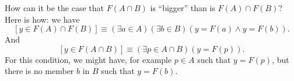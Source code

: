 \documentclass[12pt,fleqn,answers]{exam}
\begin{document}
\begin{questions}
\begin{parts}
\begin{solution}
      \quad How can it be the case that $F(A \cap B)$ is ``bigger'' 
      than is \mbox{$F(A) \cap F(B)$}? Here is how: we have
      \begin{equation*}
        \left[y \in F(A) \cap F(B) \right] \equiv
          \left(\exists a \in A\right)
          \left(\exists b \in B \right)
          \left(y = F(a) \land y = F(b)\right).
      \end{equation*}
    And 
    \begin{equation*}
      \left[y \in F(A \cap B) \right] \equiv
        \left(\exists p \in A \cap B \right)
        \left(y = F(p) \right).
    \end{equation*}
    For this condition, we might have, for example $p \in A$ such
    that $y = F(p)$, but there is no member $b$ in $B$ such
    that $y = F(b)$.



\end{solution}
\end{parts}
\end{questions}
\end{document}
